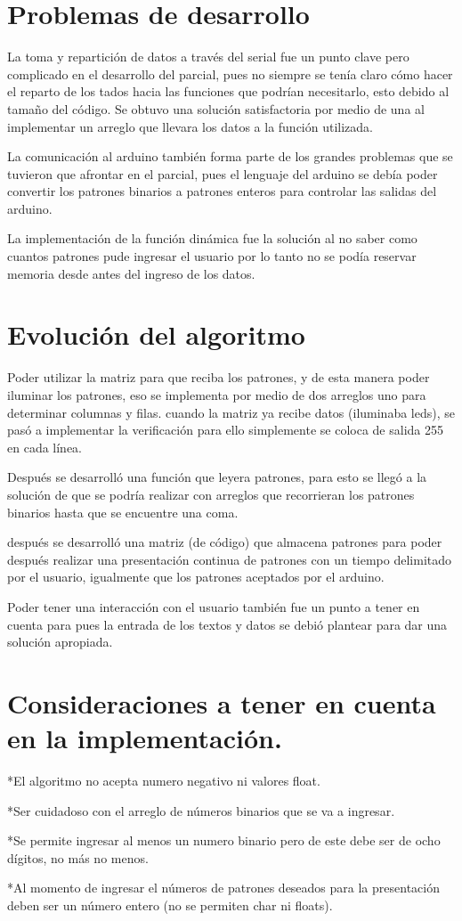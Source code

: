 \documentclass{article}
\begin{document}
\section{Problemas de desarrollo}\label{intro}
La toma y repartición de datos a través del serial fue un punto clave pero complicado en el desarrollo del parcial, pues no siempre se tenía claro cómo hacer el reparto de los tados hacia las funciones que podrían necesitarlo, esto debido al tamaño del código. Se obtuvo una solución satisfactoria por medio de una al implementar un arreglo que llevara los datos a la función utilizada.

La comunicación al arduino también forma parte de los grandes problemas que se tuvieron que afrontar en el parcial, pues el lenguaje del arduino se debía poder convertir los patrones binarios a patrones enteros para controlar las salidas del arduino.

La implementación de la función dinámica fue la solución al no saber como cuantos patrones pude ingresar el usuario por lo tanto no se podía reservar memoria desde antes del ingreso de los datos.

\section{Evolución del algoritmo}\label{intro}
Poder utilizar la matriz para que reciba los patrones, y de esta manera poder iluminar los patrones, eso se implementa por medio de dos arreglos uno para determinar columnas y filas. cuando la matriz ya recibe datos (iluminaba leds), se pasó a implementar la verificación para ello simplemente se coloca de salida 255 en cada línea. 

Después se desarrolló una función que leyera patrones, para esto se llegó a la solución de que se podría realizar con arreglos que recorrieran los patrones binarios hasta que se encuentre una coma.

después se desarrolló una matriz (de código) que almacena patrones para poder después realizar una presentación continua de patrones con un tiempo delimitado por el usuario, igualmente que los patrones aceptados por el arduino.

Poder tener una interacción con el usuario también fue un punto a tener en cuenta para pues la entrada de los textos y datos se debió plantear para dar una solución apropiada.

\section{Consideraciones a tener en cuenta en la implementación.
}\label{intro}
*El algoritmo no acepta numero negativo ni valores float.


*Ser cuidadoso con el arreglo de números binarios que se va a ingresar.


*Se permite ingresar al menos un numero binario pero de este debe ser de ocho dígitos, no más no menos.


*Al momento de ingresar el números de patrones deseados para la presentación deben ser un número entero (no se permiten char ni floats).
\end{document}
